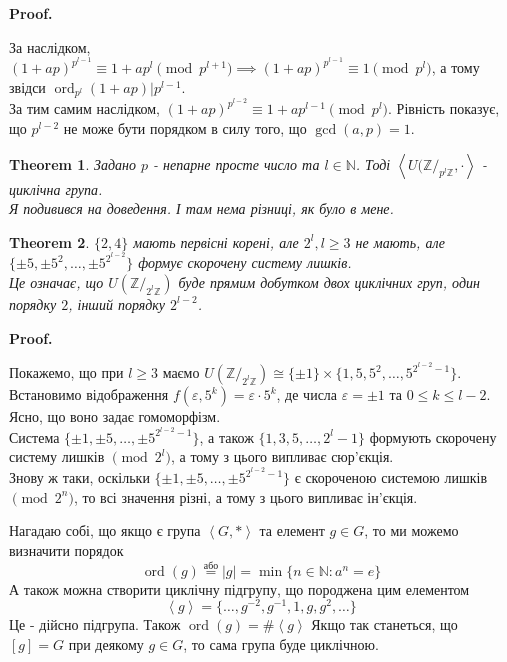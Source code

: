\documentclass[a4paper, 14pt]{extarticle}
\makeatletter
\theoremstyle{theoremdd}
\newtheorem{theorem}{Theorem}[subsection]
\theoremstyle{theoremdd}
\theoremstyle{theoremdd}
\theoremstyle{theoremdd}
\theoremstyle{theoremdd}
\theoremstyle{theoremdd}
\theoremstyle{theoremdd}
\theoremstyle{theoremdd}
\def\qed{$\blacksquare$}
\renewenvironment{proof}[1][Proof.\\]{\par
\pushQED{\hfill \qed}%
\normalfont \topsep6\p@\@plus6\p@\relax
\trivlist
\item\relax
{\bfseries
#1\@addpunct{.}}\hspace\labelsep\ignorespaces
}{%
\popQED\endtrivlist\@endpefalse
}
\DeclareMathOperator{\ord}{ord}
\makeatother
\begin{document}
\begin{proof}
За наслідком, $(1+ap)^{p^{l-1}} \equiv 1 + ap^l \pmod {p^{l+1}} \implies (1+ap)^{p^{l-1}} \equiv 1 \pmod {p^l}$, а тому звідси $\ord_{p^l} (1+ap) | p^{l-1}$.\\
За тим самим наслідком, $(1+ap)^{p^{l-2}} \equiv 1+ap^{l-1} \pmod{p^l}$. Рівність показує, що $p^{l-2}$ не може бути порядком в силу того, що $\gcd(a,p) = 1$.
\end{proof}

\begin{theorem}
Задано $p$ - непарне просте число та $l \in \mathbb{N}$. Тоді $\left< U(\mathbb{Z}/_{p^l \mathbb{Z}}, \cdot \right>$ - циклічна група.\\
\textit{Я подивився на доведення. І там нема різниці, як було в мене.}
\end{theorem}
\fi

\begin{theorem}
$\{2,4\}$ мають первісні корені, але $2^l, l \geq 3$ не мають, але $\{\pm 5, \pm 5^2, \dots , \pm 5^{2^{l-2}}\}$ формує скорочену систему лишків.\\
Це означає, що $U(\mathbb{Z}/_{2^l \mathbb{Z}})$ буде прямим добутком двох циклічних груп, один порядку $2$, інший порядку $2^{l-2}$.
\end{theorem}

\begin{proof}
Покажемо, що при $l \geq 3$ маємо $U(\mathbb{Z}/_{2^l \mathbb{Z}}) \cong \{\pm 1\} \times \{ 1, 5, 5^2, \dots, 5^{2^{l-2}-1} \}$.\\
Встановимо відображення $f(\varepsilon, 5^k) = \varepsilon \cdot 5^k$, де числа $\varepsilon = \pm 1$ та $0 \leq k \leq l-2$. Ясно, що воно задає гомоморфізм.\\
Система $\{\pm 1, \pm 5, \dots, \pm 5^{2^{l-2}-1}\}$, а також $\{1,3,5,\dots,2^{l}-1\}$ формують скорочену систему лишків $\pmod {2^l}$, а тому з цього випливає сюр'єкція.\\
Знову ж таки, оскільки $\{\pm 1, \pm 5, \dots, \pm 5^{2^{l-2}-1}\}$ є скороченою системою лишків $\pmod {2^n}$, то всі значення різні, а тому з цього випливає ін'єкція.
\end{proof}

\iffalse
Нагадаю собі, що якщо є група $\left<G, * \right>$ та елемент $g \in G$, то ми можемо визначити порядок
$$ \ord (g) \overset{\text{або}}{=} |g| = \min \{n \in \mathbb{N}: a^n = e \}$$
А також можна створити циклічну підгрупу, що породжена цим елементом
$$ \left<g\right> = \{\dots,g^{-2},g^{-1},1,g,g^2,\dots\} $$
Це - дійсно підгрупа. Також $\ord(g) = \#\left<g\right>$ Якщо так станеться, що $[g] = G$ при деякому $g \in G$, то сама група буде циклічною.
\end{document}
